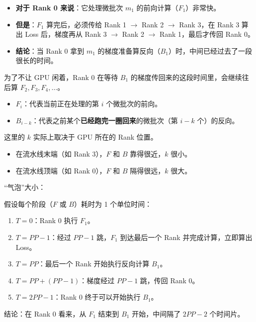 \begin{itemize}
\tightlist
\item
  \textbf{对于 Rank 0 来说}：它处理微批次 \(m_1\) 的前向计算（\(F_1\)）非常快。
\item
  \textbf{但是}：\(F_1\) 算完后，必须传给 Rank 1 \(\to\) Rank 2 \(\to\) Rank 3，在 Rank 3 算出 Loss 后，梯度再从 Rank 3 \(\to\) Rank 2 \(\to\) Rank 1，最后才传回 Rank 0。
\item
  \textbf{结论}：当 Rank 0 拿到 \(m_1\) 的梯度准备算反向（\(B_1\)）时，中间已经过去了一段很长的时间。
\end{itemize}

为了不让 GPU 闲着，Rank 0 在等待 \(B_1\) 的梯度传回来的这段时间里，会继续往后算 \(F_2, F_3, F_4, \dots\)。

\begin{itemize}
\tightlist
\item
  \(F_i\)：代表当前正在处理的第 \(i\) 个微批次的前向。
\item
  \(B_{i-k}\)：代表之前某个\textbf{已经跑完一圈回来}的微批次（第 \(i-k\) 个）的反向。
\end{itemize}

这里的 \(k\) 实际上取决于 GPU 所在的 Rank 位置。

\begin{itemize}
\tightlist
\item
  在流水线末端（如 Rank 3），\(F\) 和 \(B\) 靠得很近，\(k\) 很小。
\item
  在流水线顶端（如 Rank 0），\(F\) 和 \(B\) 隔得很远，\(k\) 很大。
\end{itemize}

``气泡''大小：

假设每个阶段（\(F\) 或 \(B\)）耗时为 1 个单位时间：

\begin{enumerate}
\def\labelenumi{\arabic{enumi}.}
\tightlist
\item
  \(T = 0\)：Rank 0 执行 \(F_1\)。
\item
  \(T = PP - 1\)：经过 \(PP - 1\) 跳，\(F_1\) 到达最后一个 Rank 并完成计算，立即算出 Loss。
\item
  \(T = PP\)：最后一个 Rank 开始执行反向计算 \(B_1\)。
\item
  \(T = PP + (PP - 1)\)：梯度经过 \(PP - 1\) 跳，传回 Rank 0。
\item
  \(T = 2PP - 1\)：Rank 0 终于可以开始执行 \(B_1\)。
\end{enumerate}

结论：在 Rank 0 看来，从 \(F_1\) 结束到 \(B_1\) 开始，中间隔了 \(2PP - 2\) 个时间片。

